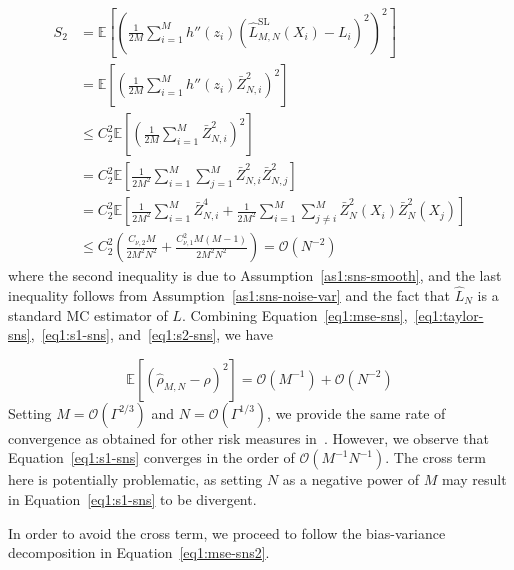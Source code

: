 \begin{align} \label{eq1:s2-sns}
    S_2 & = \mathbb{E} \left[ \left( \frac{1}{2M} \sum_{i=1}^M h''\left( z_i \right) \left( \hat{L}^{\text{SL}}_{M, N}(X_i) - L_i \right)^2 \right)^2\right] \nonumber \\
    & = \mathbb{E} \left[ \left(\frac{1}{2M} \sum_{i=1}^M h''\left( z_i \right) \bar{Z}_{N, i}^2 \right)^2 \right] \nonumber \\
    & \leq C_2^2 \mathbb{E} \left[ \left(\frac{1}{2M} \sum_{i=1}^M \bar{Z}_{N, i}^2 \right)^2 \right] \nonumber \\
    & = C_2^2 \mathbb{E} \left[ \frac{1}{2M^2} \sum_{i=1}^M \sum_{j=1}^M \bar{Z}_{N, i}^2 \bar{Z}_{N, j}^2 \right] \nonumber \\
    & = C_2^2 \mathbb{E} \left[ \frac{1}{2M^2} \sum_{i=1}^M \bar{Z}_{N, i}^4 + \frac{1}{2M^2} \sum_{i=1}^M \sum_{j \neq i}^M \bar{Z}_N^2(X_i) \bar{Z}_N^2(X_j) \right] \nonumber \\
    & \leq  C_2^2 \left(\frac{ C_{\nu, 2} M}{2M^2N^2} + \frac{C_{\nu,1}^2M(M-1)}{2M^2N^2}\right) = \mathcal{O}(N^{-2})
\end{align}
where the second inequality is due to Assumption~\ref{as1:sns-smooth}, and the last inequality follows from Assumption~\ref{as1:sns-noise-var} and the fact that $\hat{L}_N$ is a standard MC estimator of $L$.
Combining Equation~\ref{eq1:mse-sns},~\ref{eq1:taylor-sns},~\ref{eq1:s1-sns}, and~\ref{eq1:s2-sns}, we have

\begin{equation} \label{eq1:mse-sns-smooth}
    \mathbb{E} \left[ \left( \hat{\rho}_{M, N} - \rho \right)^2 \right] = \mathcal{O}(M^{-1}) + \mathcal{O}(N^{-2})
\end{equation}
Setting $M = \mathcal{O}(\Gamma^{2/3})$ and $N = \mathcal{O}(\Gamma^{1/3})$, we provide the same rate of convergence as obtained for other risk measures in~\cite{gordy2010nested}.
However, we observe that Equation~\ref{eq1:s1-sns} converges in the order of $\mathcal{O}(M^{-1}N^{-1})$.
The cross term here is potentially problematic, as setting $N$ as a negative power of $M$ may result in Equation~\ref{eq1:s1-sns} to be divergent.

In order to avoid the cross term, we proceed to follow the bias-variance decomposition in Equation~\ref{eq1:mse-sns2}.

